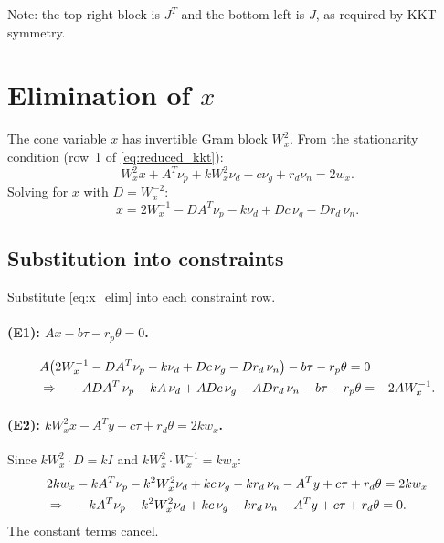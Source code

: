 \documentclass{article}
\begin{document}
Note: the top-right block is $J^T$ and the bottom-left is $J$, as required by KKT symmetry.

\section{Elimination of $x$}

The cone variable $x$ has invertible Gram block $W_x^2$. From the stationarity condition (row~1 of \eqref{eq:reduced_kkt}):
\begin{equation} \label{eq:x_stationarity}
  W_x^2 x + A^T \nu_p + k W_x^2 \nu_d - c \nu_g + r_d \nu_n = 2 w_x.
\end{equation}
Solving for $x$ with $D = W_x^{-2}$:
\begin{equation} \label{eq:x_elim}
  x = 2 W_x^{-1} - D A^T \nu_p - k \nu_d + D c \, \nu_g - D r_d \, \nu_n.
\end{equation}

\subsection{Substitution into constraints}

Substitute \eqref{eq:x_elim} into each constraint row.

\paragraph{(E1): $Ax - b\tau - r_p \theta = 0$.}
\begin{align}
  &A\bigl(2W_x^{-1} - DA^T \nu_p - k\nu_d + Dc\,\nu_g - Dr_d\,\nu_n\bigr) - b\tau - r_p\theta = 0 \notag\\
  &\Rightarrow\quad -ADA^T\,\nu_p - kA\,\nu_d + ADc\,\nu_g - ADr_d\,\nu_n - b\tau - r_p\theta = -2AW_x^{-1}. \label{eq:e1_elim}
\end{align}

\paragraph{(E2): $kW_x^2 x - A^Ty + c\tau + r_d\theta = 2kw_x$.}
Since $kW_x^2 \cdot D = kI$ and $kW_x^2 \cdot W_x^{-1} = kw_x$:
\begin{align}
  &2kw_x - kA^T\nu_p - k^2W_x^2\nu_d + kc\,\nu_g - kr_d\,\nu_n - A^Ty + c\tau + r_d\theta = 2kw_x \notag\\
  &\Rightarrow\quad -kA^T\nu_p - k^2W_x^2\nu_d + kc\,\nu_g - kr_d\,\nu_n - A^Ty + c\tau + r_d\theta = 0. \label{eq:e2_elim}
\end{align}
The constant terms cancel.
\end{document}
